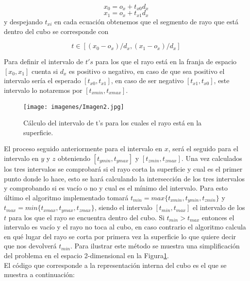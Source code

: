 \[
	x_0 = o_x + t_{x0}d_x
\]
\[
	x_1 = o_x + t_{x1}d_x
\]
y despejando $t_{xi}$ en cada ecuación obtenemos que el segmento de rayo que está dentro del cubo se corresponde con

\[
	t \in [(x_0-o_x)/d_x, (x_1-o_x)/d_x]
\]

Para definir el intervalo de $t's$ para los que el rayo está en la franja de espacio $[x_0, x_1]$ cuenta si $d_x$ es positivo o negativo, en caso de que sea positivo el intervalo sería el esperado $[t_{x0}, t_{x1}]$, en caso de ser negativo $[t_{x1}, t_{x0}]$, este intervalo lo notaremos por $[t_{x min}, t_{x max}]$.
	${ }$\\	
\begin{figure}
	\begin{center}
		\texttt{[image: imagenes/Imagen2.jpg]}
	\end{center}
	\caption{Cálculo del intervalo de t's para los cuales el rayo está en la superficie.}
	\label{fig:etiq_4}
\end{figure}




El proceso seguido anteriormente para el intervalo en $x$, será el seguido para el intervalo en $y$ y $z$ obteniendo $[t_{y min}, t_{y max}]$ y $[t_{z min}, t_{z max}]$. Una vez calculados los tres intervalos se comprobará si el rayo corta la superficie y cual es el primer punto donde lo hace, esto se hará calculando la intersección de los tres intervalos y comprobando si es vacío o no y cual es el mínimo del intervalo. Para esto último el algoritmo implementado tomará $t_{min} = max\{t_{x min}, t_{y min}, t_{z min}\}$ y $t_{max} = min\{t_{x max}, t_{y max}, t_{z max}\}$, siendo el intervalo $[t_{min}, t_{max}]$ el intervalo de los $t$ para los que el rayo se encuentra dentro del cubo. Si $t_{min} > t_{max}$ entonces el intervalo es vacío y el rayo no toca al cubo, en caso contrario el algoritmo calcula en qué lugar del rayo se corta por primera vez la superficie lo que quiere decir que nos devolverá $t_{min}$. Para ilustrar este método se muestra una simplificación del problema en el espacio 2-dimensional en la Figura\ref{fig:etiq_4}.
	${ }$\\	



El código que corresponde a la representación interna del cubo es el que se muestra a continuación:

